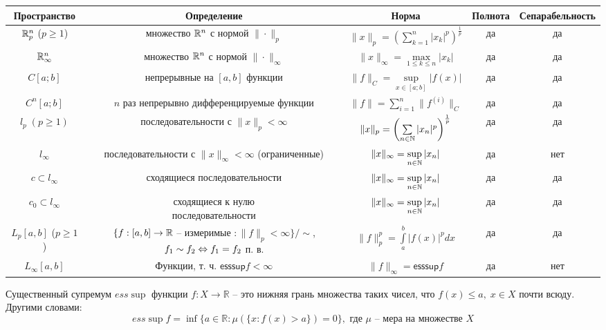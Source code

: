 \begin{table}[H]
\begin{tabular}{|c|c|c|c|c|}
\hline
 Пространство & Определение & 
 Норма & Полнота & Сепарабельность \\ \hline
 $\mathbb{R}^n_p$ ($p \geqslant 1$) & 
 множество $\mathbb{R}^n$ с нормой $\|\cdot\|_p$ &
 $\|x\|_p = \left(\sum \limits_{k = 1}^n |x_k|^p\right)^{\frac 1p}$ & да & да \\ \hline
 $\mathbb{R}^n_\infty$ & 
 множество $\mathbb{R}^n$ с нормой $\|\cdot\|_{\infty}$ &
 $\|x\|_{\infty} = \max \limits_{1 \leqslant k \leqslant n} |x_k|$ 
 & да & да \\ \hline
 $C[a;b]$ & 
непрерывные на $[a, b]$ функции &
 $\|f\|_C = \sup\limits_{x \in [a; b]} |f(x)|$ & да & да \\ \hline
 $C^n[a;b]$ &
 \makecell{$n$ раз непрерывно \\ 
 дифференцируемые функции} &
 $\|f\| = \sum \limits_{i = 1}^n \|f^{(i)}\|_C$ &
 да & да \\ \hline
 $l_p\; (p \geqslant 1)$ & 
 последовательности с $\|x\|_p < \infty$ &
  $\|x\|_p = \left(\sum\limits_{n \in \mathbb{N}} |x_n|^p\right)^{\frac{1}{p}}$ & да & да \\ \hline
  $l_\infty$ & 
  \makecell{последовательности с $\|x\|_{\infty} < \infty$ \\
  (ограниченные)} &
  $\|x\|_{\infty} = \sup\limits_{n \in \mathbb{N}} |x_n|$ & да & нет \\ \hline
  $c \subset l_{\infty}$ &
  сходящиеся последовательности & 
  $\|x\|_{\infty} = \sup\limits_{n \in \mathbb{N}} |x_n|$ & да & да \\ \hline
  $c_0 \subset l_{\infty}$ &
  \makecell{сходящиеся к нулю \\ последовательности} & 
  $\|x\|_{\infty} = \sup\limits_{n \in \mathbb{N}} |x_n|$ & да & да \\ \hline
  $L_p[a, b]$ ($p \geqslant 1$) & 
  \makecell{$\{f : [a, b] \to \R$ -- измеримые \\ $: \|f\|_p < \infty \} / \sim$, \\ $f_1 \sim f_2 \Leftrightarrow f_1 = f_2$ п. в.} &
  $\|f\|_p^p = \int \limits_a^b |f(x)|^p dx$ &
  да & да \\ \hline
  $L_{\infty}[a, b]$ &
  Функции, т. ч. $\mathsf{esssup} f < \infty$ &
  $\|f\|_{\infty} = \mathsf{esssup} f$ &
  да & нет \\ \hline
\end{tabular}
\end{table}

\begin{note}
Существенный супремум ${ess}\sup$ функции $f:X\to \mathbb{R}$ -- это нижняя грань множества таких чисел, что $f(x) \leqslant a, \; x\in X$ почти всюду. Другими словами:
$$ess \sup f = \inf \{ a \in \mathbb{R} : \mu(\{x : f(x) > a\}) = 0\}, \text{ где } \mu \text{ -- мера на множестве } X $$
\end{note}

